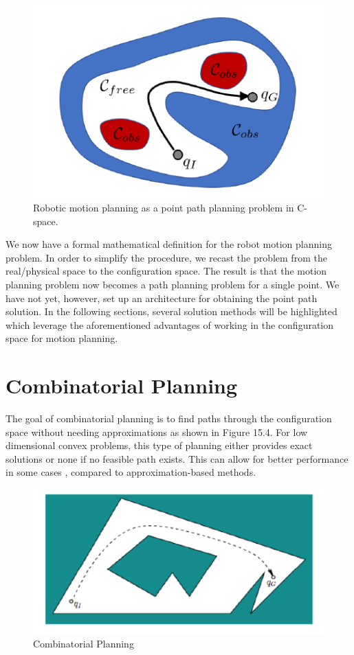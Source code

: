 \documentclass[twoside]{article}
\begin{document}
\begin{figure}[h]
\begin{center}
\includegraphics{fig15_3.PNG}
\caption{Robotic motion planning as a point path planning problem in C-space.}
\end{center}
\end{figure}

We now have a formal mathematical definition for the robot motion planning problem. In order to simplify the procedure, we recast the problem from the real/physical space to the configuration space. The result is that the motion planning problem now becomes a path planning problem for a single point. We have not yet, however, set up an architecture for obtaining the point path solution. In the following sections, several solution methods will be highlighted which leverage the aforementioned advantages of working in the configuration space for motion planning.

\section{Combinatorial Planning}
The goal of combinatorial planning is to find paths through the configuration space without needing approximations as shown in Figure 15.4. For low dimensional convex problems, this type of planning either provides exact solutions or none if no feasible path exists. This can allow for better performance in some cases , compared to approximation-based methods.

\begin{figure}[h]
\begin{center}
\includegraphics{fig15_4.PNG}
\caption{Combinatorial Planning}
\end{center}
\end{figure}
\end{document}

